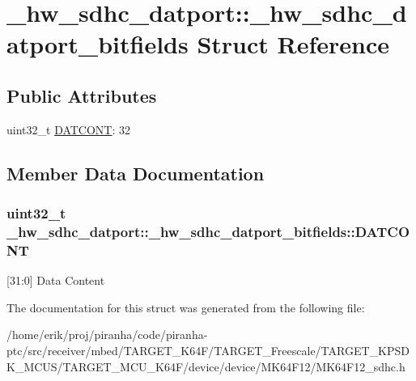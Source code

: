 \hypertarget{struct__hw__sdhc__datport_1_1__hw__sdhc__datport__bitfields}{}\section{\+\_\+hw\+\_\+sdhc\+\_\+datport\+:\+:\+\_\+hw\+\_\+sdhc\+\_\+datport\+\_\+bitfields Struct Reference}
\label{struct__hw__sdhc__datport_1_1__hw__sdhc__datport__bitfields}
\subsection*{Public Attributes}
\begin{DoxyCompactItemize}
\item 
uint32\+\_\+t \hyperlink{struct__hw__sdhc__datport_1_1__hw__sdhc__datport__bitfields_ab8e3eca3925d6a9fb547a4ca9509bcfa}{D\+A\+T\+C\+O\+NT}\+: 32
\end{DoxyCompactItemize}


\subsection{Member Data Documentation}
\subsubsection[{\texorpdfstring{D\+A\+T\+C\+O\+NT}{DATCONT}}]{\setlength{\rightskip}{0pt plus 5cm}uint32\+\_\+t \+\_\+hw\+\_\+sdhc\+\_\+datport\+::\+\_\+hw\+\_\+sdhc\+\_\+datport\+\_\+bitfields\+::\+D\+A\+T\+C\+O\+NT}\hypertarget{struct__hw__sdhc__datport_1_1__hw__sdhc__datport__bitfields_ab8e3eca3925d6a9fb547a4ca9509bcfa}{}\label{struct__hw__sdhc__datport_1_1__hw__sdhc__datport__bitfields_ab8e3eca3925d6a9fb547a4ca9509bcfa}
\mbox{[}31\+:0\mbox{]} Data Content 

The documentation for this struct was generated from the following file\+:\begin{DoxyCompactItemize}
\item 
/home/erik/proj/piranha/code/piranha-\/ptc/src/receiver/mbed/\+T\+A\+R\+G\+E\+T\+\_\+\+K64\+F/\+T\+A\+R\+G\+E\+T\+\_\+\+Freescale/\+T\+A\+R\+G\+E\+T\+\_\+\+K\+P\+S\+D\+K\+\_\+\+M\+C\+U\+S/\+T\+A\+R\+G\+E\+T\+\_\+\+M\+C\+U\+\_\+\+K64\+F/device/device/\+M\+K64\+F12/M\+K64\+F12\+\_\+sdhc.\+h\end{DoxyCompactItemize}
